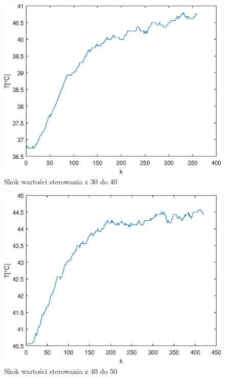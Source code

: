 \begin{figure}[h!]
	\centering
	\includegraphics[scale=1]{Rys/Skok30_40.eps}
	\caption{Skok wartości sterowania z 30 do 40}
	\label{skok2}
\end{figure}

\begin{figure}[h!]
	\centering
	\includegraphics[scale=1]{Rys/Skok40_50.eps}
	\caption{Skok wartości sterowania z 40 do 50}
	\label{skok3}
\end{figure}

